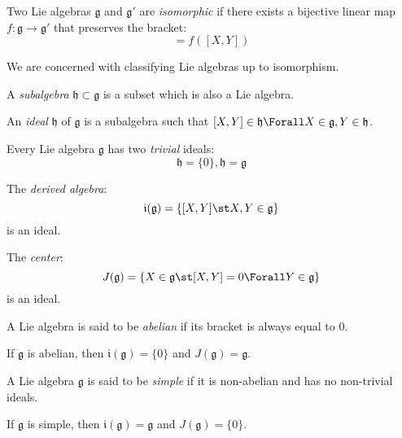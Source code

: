 \documentclass{jknotes}
\begin{document}
\begin{defn}
    Two Lie algebras \(\mathfrak{g}\) and \(\mathfrak{g}'\) are \emph{isomorphic} if there exists a bijective linear map \(f:\mathfrak{g}\rightarrow\mathfrak{g}'\) that preserves the bracket:
    \begin{equation}
        [f(X),f(Y)] = f([X,Y])
    \end{equation}
\end{defn}
We are concerned with classifying Lie algebras up to isomorphism.

\begin{defn}
    A \emph{subalgebra} \(\mathfrak{h} \subset \mathfrak{g}\) is a subset which is also a Lie algebra.
\end{defn}
\begin{defn}
    An \emph{ideal} \(\mathfrak{h}\) of \(\mathfrak{g}\) is a subalgebra such that \([X,Y]\in\mathfrak{h} \Forall X\in\mathfrak{g},Y\in\mathfrak{h}\).
\end{defn}
\begin{eg}
    Every Lie algebra \(\mathfrak{g}\) has two \emph{trivial} ideals:
    \begin{equation}
        \mathfrak{h} = \{0\}, \mathfrak{h} = \mathfrak{g}
    \end{equation}
\end{eg}
\begin{eg}
    The \emph{derived algebra}:
    \begin{equation}
        \mathfrak{i}(\mathfrak{g}) = \{[X,Y] \st X,Y \in \mathfrak{g}\}
    \end{equation}
    is an ideal.
\end{eg}
\begin{eg}
    The \emph{center}:
    \begin{equation}
        J(\mathfrak{g}) = \{X \in \mathfrak{g} \st [X,Y] = 0 \Forall Y \in \mathfrak{g}\}
    \end{equation}
    is an ideal.
\end{eg}

\begin{defn}
    A Lie algebra is said to be \emph{abelian} if its bracket is always equal to \(0\).
\end{defn}
If \(\mathfrak{g}\) is abelian, then \(\mathfrak{i}(\mathfrak{g}) = \{0\}\) and \(J(\mathfrak{g}) = \mathfrak{g}\).

\begin{defn}
    A Lie algebra \(\mathfrak{g}\) is said to be \emph{simple} if it is non-abelian and has no non-trivial ideals.
\end{defn}
If \(\mathfrak{g}\) is simple, then \(\mathfrak{i}(\mathfrak{g}) = \mathfrak{g}\) and  \(J(\mathfrak{g}) = \{0\}\).
\end{document}
